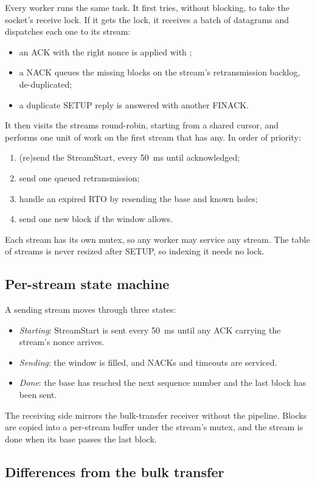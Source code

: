 Every worker runs the same task. It first tries, without blocking, to take the socket's receive lock. If it gets
the lock, it receives a batch of datagrams and dispatches each one to its stream:
\begin{itemize}
  \item an ACK with the right nonce is applied with \vviii;
  \item a NACK queues the missing blocks on the stream's retransmission backlog, de-duplicated\vviii;
  \item a duplicate SETUP reply is answered with another FINACK.
\end{itemize}
It then visits the streams round-robin, starting from a shared cursor, and performs one unit of work on the first
stream that has any. In order of priority:
\begin{enumerate}
  \item (re)send the StreamStart, every 50~ms until acknowledged;
  \item send one queued retransmission;
  \item handle an expired RTO by resending the base and known holes\vviii;
  \item send one new block if the window allows.
\end{enumerate}
Each stream has its own mutex, so any worker may service any stream. The table of streams is never resized
after SETUP, so indexing it needs no lock.

\subsection{Per-stream state machine}

A sending stream moves through three states:
\begin{itemize}
  \item \emph{Starting}: StreamStart is sent every 50~ms until any ACK carrying the stream's nonce arrives.
  \item \emph{Sending}: the window is filled, and NACKs and timeouts are serviced.
  \item \emph{Done}: the base has reached the next sequence number and the last block has been sent.
\end{itemize}
The receiving side mirrors the bulk-transfer receiver without the pipeline. Blocks are copied into a per-stream
buffer under the stream's mutex, and the stream is done when its base passes the last block.

\subsection{Differences from the bulk transfer}

